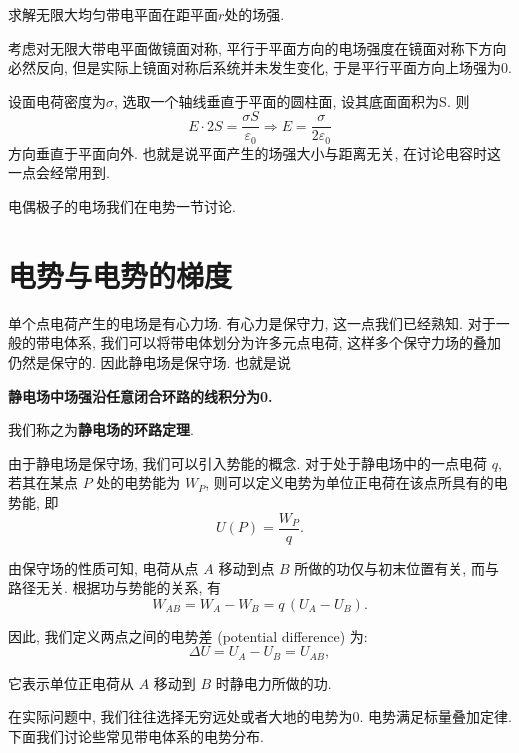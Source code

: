 \begin{example}
  求解无限大均匀带电平面在距平面$r$处的场强.

  考虑对无限大带电平面做镜面对称, 平行于平面方向的电场强度在镜面对称下方向必然反向, 但是实际上镜面对称后系统并未发生变化, 于是平行平面方向上场强为0.

  设面电荷密度为$\sigma$, 选取一个轴线垂直于平面的圆柱面, 设其底面面积为S. 则
  \[
  E \cdot 2S = \frac{\sigma S}{\varepsilon_0} \Rightarrow E = \frac{\sigma}{2\varepsilon_0}
  \]
  方向垂直于平面向外. 也就是说平面产生的场强大小与距离无关, 在讨论电容时这一点会经常用到.
\end{example}

电偶极子的电场我们在电势一节讨论.

\section{电势与电势的梯度}

单个点电荷产生的电场是有心力场. 有心力是保守力, 这一点我们已经熟知. 对于一般的带电体系, 我们可以将带电体划分为许多元点电荷, 这样多个保守力场的叠加仍然是保守的. 因此静电场是保守场. 也就是说
\begin{center}
  \textbf{静电场中场强沿任意闭合环路的线积分为0.}
\end{center}

我们称之为\textbf{静电场的环路定理}.

由于静电场是保守场, 我们可以引入势能的概念. 对于处于静电场中的一点电荷 $q$, 若其在某点 $P$ 处的电势能为 $W_P$, 则可以定义电势为单位正电荷在该点所具有的电势能, 即
\[
U(P)=\frac{W_P}{q}.
\]

由保守场的性质可知, 电荷从点 $A$ 移动到点 $B$ 所做的功仅与初末位置有关, 而与路径无关. 根据功与势能的关系, 有
\[
W_{AB} = W_A - W_B = q\,(U_A - U_B).
\]

因此, 我们定义两点之间的电势差 (potential difference) 为:
\[
\Delta U = U_A - U_B = U_{AB},
\]

它表示单位正电荷从 $A$ 移动到 $B$ 时静电力所做的功.

在实际问题中, 我们往往选择无穷远处或者大地的电势为0. 电势满足标量叠加定律. 下面我们讨论些常见带电体系的电势分布.

